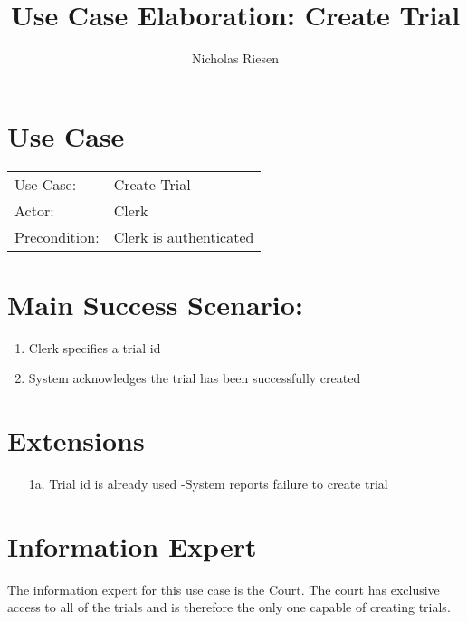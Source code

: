 \documentclass{article}
\title{Use Case Elaboration: Create Trial}
\author{Nicholas Riesen}
\begin{document}
\maketitle

\section*{Use Case}
\begin{tabular}{l l}
  Use Case:     &  Create Trial            \\
  Actor:        &  Clerk                   \\
  Precondition: &  Clerk is authenticated  \\
\end{tabular}

\section*{Main Success Scenario:}
\begin{enumerate}
   \item Clerk specifies a trial id
   \item System acknowledges the trial has been successfully created
\end{enumerate}

\section*{Extensions}
\begin{itemize}
  \item [1a.] Trial id is already used
       -System reports failure to create trial
\end{itemize}

\section*{Information Expert}
The information expert for this use case is the Court. The court has exclusive access to all of the trials and is therefore the only one capable of creating trials. 
\end{document}
